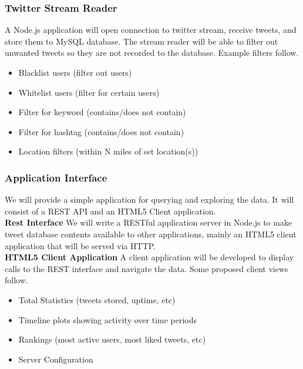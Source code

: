 \documentclass[11pt]{article}
\begin{document}
\subsubsection{Twitter Stream Reader}
A Node.js application will open connection to twitter stream, receive tweets, and store them to MySQL database. The stream reader will be able to filter out unwanted tweets so they are not recorded to the database. Example filters follow.

\begin{itemize}
\itemsep0em
\item Blacklist users (filter out users)
\item Whitelist users (filter for certain users)
\item Filter for keyword (contains/does not contain)
\item Filter for hashtag (contains/does not contain)
\item Location filters (within N miles of set location(s))
\end{itemize}

\subsubsection{Application Interface}
We will provide a simple application for querying and exploring the data. It will consist of a REST API and an HTML5 Client application.\\

\textbf{Rest Interface}
We will write a RESTful application server in Node.js to make tweet database contents available to other applications, mainly an HTML5 client application that will be served via HTTP.\\

\textbf{HTML5 Client Application}
A client application will be developed to display calls to the REST interface and navigate the data. Some proposed client views follow.

\begin{itemize}
\itemsep0em
\item Total Statistics (tweets stored, uptime, etc)
\item Timeline plots showing activity over time periods
\item Rankings (most active users, most liked tweets, etc)
\item Server Configuration
\end{itemize}




\end{document}
